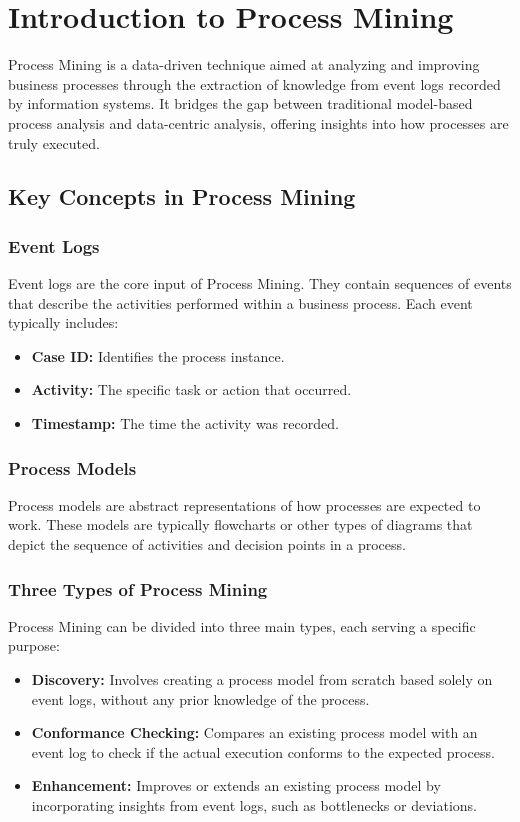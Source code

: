 \chapter{Introduction to Process Mining}

    Process Mining is a data-driven technique aimed at analyzing and improving business processes through the extraction of knowledge from event logs recorded by information systems. It bridges the gap between traditional model-based process analysis and data-centric analysis, offering insights into how processes are truly executed.
    
    \section{Key Concepts in Process Mining}
    
    \subsection{Event Logs}
    Event logs are the core input of Process Mining. They contain sequences of events that describe the activities performed within a business process. Each event typically includes:
    \begin{itemize}
        \item \textbf{Case ID:} Identifies the process instance.
        \item \textbf{Activity:} The specific task or action that occurred.
        \item \textbf{Timestamp:} The time the activity was recorded.
    \end{itemize}
    
    \subsection{Process Models}
    Process models are abstract representations of how processes are expected to work. These models are typically flowcharts or other types of diagrams that depict the sequence of activities and decision points in a process.
    
    \subsection{Three Types of Process Mining}
    Process Mining can be divided into three main types, each serving a specific purpose:
    \begin{itemize}
        \item \textbf{Discovery:} Involves creating a process model from scratch based solely on event logs, without any prior knowledge of the process.
        \item \textbf{Conformance Checking:} Compares an existing process model with an event log to check if the actual execution conforms to the expected process.
        \item \textbf{Enhancement:} Improves or extends an existing process model by incorporating insights from event logs, such as bottlenecks or deviations.
    \end{itemize}
    
